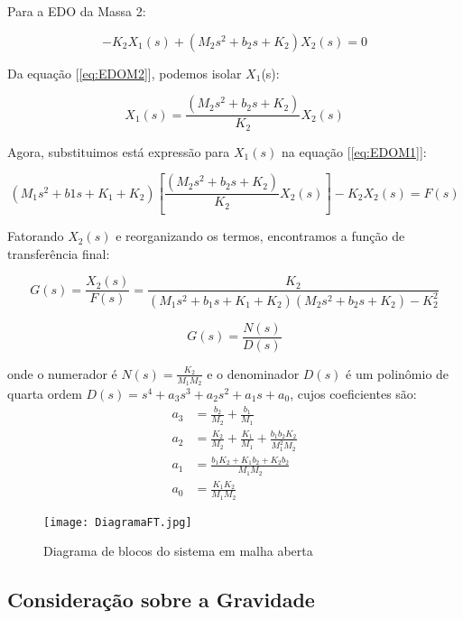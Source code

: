 \documentclass[9pt,a4paper,twocolumn,twoside]{tau-class/tau}
\begin{document}
Para a EDO da Massa 2:

\begin{equation}
    -K_2X_1(s) + (M_2s^2 + b_2s + K_2)X_2(s) = 0
    \label{eq:EDOM2}
\end{equation}

Da equação [\ref{eq:EDOM2}], podemos isolar $X_1$(s):

\begin{equation}
    X_1(s) = \frac{(M_2s^2 + b_2s + K_2)}{K_2}X_2(s)
    \label{eq:X1iso}
\end{equation}

Agora, substituimos está expressão para $X_1(s)$ na equação [\ref{eq:EDOM1}]:

\begin{equation}
    (M_1s^2 + b1s + K_1 + K_2)\left[\frac{(M_2s^2 + b_2s + K_2)}{K_2}X_2(s)\right] - K_2X_2(s) = F(s)
    \label{eq:substX1}
\end{equation}

Fatorando $X_2(s)$ e reorganizando os termos, encontramos a função de transferência final:

\begin{equation}
    G(s) = \frac{X_2 (s)}{F(s)} = \frac{K_2}{(M_1 s^2 + b_1 s + K_1 + K_2)(M_2 s^2 + b_2 s + K_2) - K_2 ^2}
\label{eq: FT}
\end{equation}

\begin{equation}
    G(s) = \frac{N(s)}{D(s)}
    \label{eq: FTresum}
\end{equation}

onde o numerador é $N(s) = \frac{K_2}{M_1M_2}$ e o denominador $D(s)$ é um polinômio de quarta ordem $D(s) = s^4 + a_3s^3 + a_2s^2 + a_1s + a_0$, cujos coeficientes são:
\begin{align}
    a_3 &= \frac{b_2}{M_2} + \frac{b_1}{M_1} \\
    a_2 &= \frac{K_2}{M_2} + \frac{K_1}{M_1} + \frac{b_1b_2K_2}{M_1^2M_2} \\
    a_1 &= \frac{b_1K_2 + K_1b_2 + K_2b_2}{M_1M_2} \\
    a_0 &= \frac{K_1K_2}{M_1M_2}
\end{align}

\begin{figure}[H]
    \centering
    \texttt{[image: DiagramaFT.jpg]}
    \caption{Diagrama de blocos do sistema em malha aberta}
    \label{DiagramaFT}
\end{figure}

\subsection{Consideração sobre a Gravidade}
\end{document}
